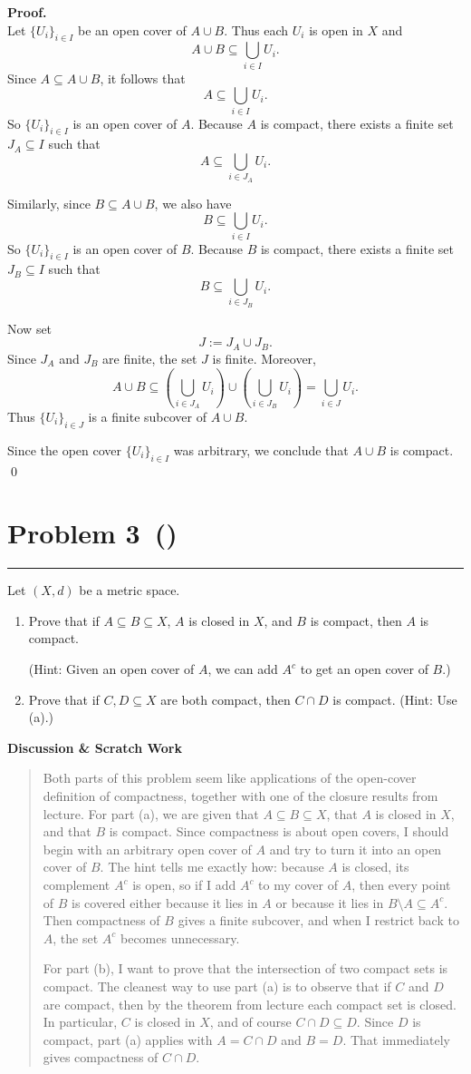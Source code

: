 \documentclass[12pt]{article}
\makeatletter
\newenvironment{scratch}{%
  \par\smallskip
  \noindent\textbf{Discussion \& Scratch Work}\begin{quote}\small
}{%
  \end{quote}\smallskip
}
\newcommand{\problem}[2][]{%
  \def\prob@title{Problem #2\if\relax\detokenize{#1}\relax\else\ (\textit{#1})\fi}%
  \phantomsection%
  \pdfbookmark[1]{\prob@title}{prob#2}%
  \addcontentsline{toc}{section}{\prob@title}%
  \section*{\prob@title}%
  \vspace{-0.25em}\hrule\vspace{0.8em}%
}
\makeatother
\begin{document}
\textbf{Proof.}\\
Let $\{U_i\}_{i\in I}$ be an open cover of $A\cup B$. Thus each $U_i$ is open in $X$ and
\[
A\cup B\subseteq \bigcup_{i\in I} U_i.
\]
Since $A\subseteq A\cup B$, it follows that
\[
A\subseteq \bigcup_{i\in I} U_i.
\]
So $\{U_i\}_{i\in I}$ is an open cover of $A$. Because $A$ is compact, there exists a finite set $J_A\subseteq I$ such that
\[
A\subseteq \bigcup_{i\in J_A} U_i.
\]

Similarly, since $B\subseteq A\cup B$, we also have
\[
B\subseteq \bigcup_{i\in I} U_i.
\]
So $\{U_i\}_{i\in I}$ is an open cover of $B$. Because $B$ is compact, there exists a finite set $J_B\subseteq I$ such that
\[
B\subseteq \bigcup_{i\in J_B} U_i.
\]

Now set
\[
J:=J_A\cup J_B.
\]
Since $J_A$ and $J_B$ are finite, the set $J$ is finite. Moreover,
\[
A\cup B
\subseteq
\left(\bigcup_{i\in J_A} U_i\right)\cup \left(\bigcup_{i\in J_B} U_i\right)
=
\bigcup_{i\in J} U_i.
\]
Thus $\{U_i\}_{i\in J}$ is a finite subcover of $A\cup B$.

Since the open cover $\{U_i\}_{i\in I}$ was arbitrary, we conclude that $A\cup B$ is compact.
\qed


\newpage

\problem[]{3}
Let $(X,d)$ be a metric space.
\begin{enumerate}[label=\textbf{(\alph*)}]
  \item Prove that if $A\subseteq B\subseteq X$, $A$ is closed in $X$, and $B$
  is compact, then $A$ is compact.

  (Hint: Given an open cover of $A$, we can add $A^c$ to get an open cover of
  $B$.)
  \item Prove that if $C,D\subseteq X$ are both compact, then $C\cap D$ is
  compact. (Hint: Use (a).)
\end{enumerate}

\begin{scratch}
Both parts of this problem seem like applications of the open-cover definition of compactness, together with one of the closure results from lecture. For part (a), we are given that $A\subseteq B\subseteq X$, that $A$ is closed in $X$, and that $B$ is compact. Since compactness is about open covers, I should begin with an arbitrary open cover of $A$ and try to turn it into an open cover of $B$. The hint tells me exactly how: because $A$ is closed, its complement $A^c$ is open, so if I add $A^c$ to my cover of $A$, then every point of $B$ is covered either because it lies in $A$ or because it lies in $B\setminus A\subseteq A^c$. Then compactness of $B$ gives a finite subcover, and when I restrict back to $A$, the set $A^c$ becomes unnecessary.

For part (b), I want to prove that the intersection of two compact sets is compact. The cleanest way to use part (a) is to observe that if $C$ and $D$ are compact, then by the theorem from lecture each compact set is closed. In particular, $C$ is closed in $X$, and of course $C\cap D\subseteq D$. Since $D$ is compact, part (a) applies with $A=C\cap D$ and $B=D$. That immediately gives compactness of $C\cap D$.
\end{scratch}
\end{document}
